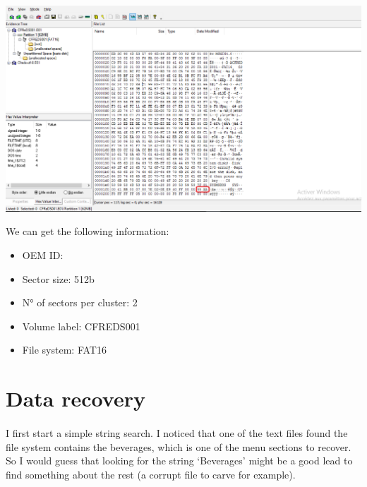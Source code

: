 \documentclass[
	12pt, %
]{fphw}
\begin{document}
\begin{center}
	\includegraphics[width=0.9\columnwidth]{fig2.png}
	\label{fig:fig2}
\end{center}
\vspace{2mm}

We can get the following information:

\begin{itemize}
	\item OEM ID:
	\item Sector size: 512b
	\item N° of sectors per cluster: 2
	\item Volume label: CFREDS001
	\item File system: FAT16
\end{itemize}

\section{Data recovery}
\label{sec:doc1}

\paragraph{}
I first start a simple string search. I noticed that one of the text files found the file system contains
the beverages, which is one of the menu sections to recover. So I would guess that looking for the
string ‘Beverages’ might be a good lead to find something about the rest (a corrupt file to carve for
example).
\end{document}
